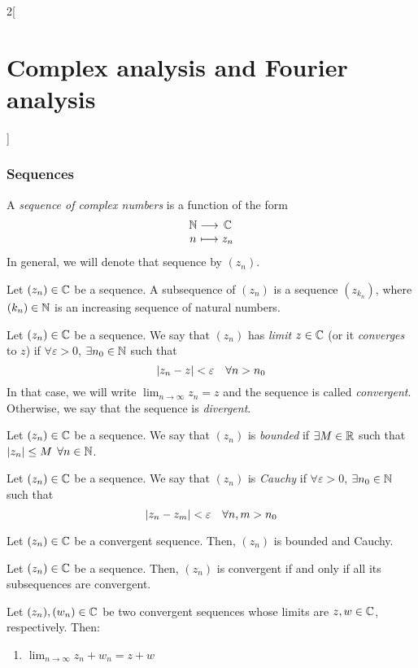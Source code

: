 \documentclass[../../../main.tex]{subfiles}
\begin{document}
\begin{multicols}{2}[\section{Complex analysis and Fourier analysis}]
  \subsubsection{Sequences}
  \begin{definition}
    A \textit{sequence of complex numbers} is a function of the form $$\function{}{\NN}{\CC}{n}{z_n}$$ In general, we will denote that sequence by $(z_n)$.
  \end{definition}
  \begin{definition}
    Let $(z_n)\in\mathbb{C}$ be a sequence. A subsequence of $(z_n)$ is a sequence $(z_{k_n})$, where $(k_n)\in\mathbb{N}$ is an increasing sequence of natural numbers.
  \end{definition}
  \begin{definition}
    Let $(z_n)\in\mathbb{C}$ be a sequence. We say that $(z_n)$ has \emph{limit} $z\in\mathbb{C}$ (or it \textit{converges} to $z$) if $\forall\varepsilon>0$, $\exists n_0\in\mathbb{N}$ such that $$\abs{z_n - z} < \varepsilon\quad \forall n > n_0$$ In that case, we will write $\displaystyle\lim_{n \to \infty} z_n = z$ and the sequence is called \emph{convergent}. Otherwise, we say that the sequence is \emph{divergent}.
  \end{definition}
  \begin{definition}
    Let $(z_n)\in\mathbb{C}$ be a sequence. We say that $(z_n)$ is \emph{bounded} if $\exists M\in\mathbb{R}$ such that $\abs{z_n}\leq M$ $\forall n\in\mathbb{N}$.
  \end{definition}
  \begin{definition}
    Let $(z_n)\in\mathbb{C}$ be a sequence. We say that $(z_n)$ is \emph{Cauchy} if $\forall\varepsilon>0$, $\exists n_0\in\mathbb{N}$ such that $$\abs{z_n - z_m} < \varepsilon\quad \forall n,m > n_0$$
  \end{definition}
  \begin{proposition}
    Let $(z_n)\in\mathbb{C}$ be a convergent sequence. Then, $(z_n)$ is bounded and Cauchy.
  \end{proposition}
  \begin{proposition}
    Let $(z_n)\in\mathbb{C}$ be a sequence. Then, $(z_n)$ is convergent if and only if all its subsequences are convergent.
  \end{proposition}
  \begin{proposition}
    Let $(z_n),(w_n)\in\mathbb{C}$ be two convergent sequences whose limits are $z,w\in \mathbb{C}$, respectively. Then:
    \begin{enumerate}
      \item $\displaystyle\lim_{n\to\infty}z_n+w_n=z+w$

\end{enumerate}
\end{proposition}
\end{multicols}
\end{document}
